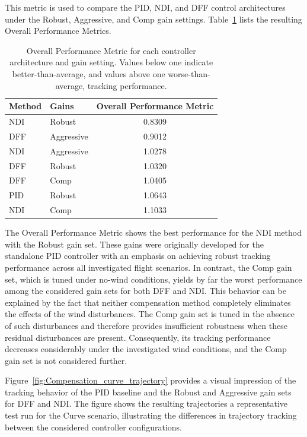 This metric is used to compare the PID, NDI, and DFF control architectures under the Robust, Aggressive, and Comp gain settings. Table~\ref{tab:performance_metric} lists the resulting Overall Performance Metrics.

\begin{table}[htbp]
	\centering
	\caption{Overall Performance Metric for each controller architecture and gain setting. Values below one indicate better-than-average, and values above one worse-than-average, tracking performance.}
	\label{tab:performance_metric}
	\begin{tabular}{llc}
		\toprule
		Method & Gains & Overall Performance Metric \\
		\midrule
		NDI & Robust & 0.8309 \\
		DFF & Aggressive & 0.9012 \\
		NDI & Aggressive & 1.0278 \\
		DFF & Robust & 1.0320 \\
		DFF & Comp & 1.0405 \\
		PID & Robust & 1.0643 \\
		NDI & Comp & 1.1033 \\
		\bottomrule
	\end{tabular}
\end{table}

The Overall Performance Metric shows the best performance for the NDI method with the Robust gain set. These gains were originally developed for the standalone PID controller with an emphasis on achieving robust tracking performance across all investigated flight scenarios. 
In contrast, the Comp gain set, which is tuned under no-wind conditions, yields by far the worst performance among the considered gain sets for both DFF and NDI. This behavior can be explained by the fact that neither compensation method completely eliminates the effects of the wind disturbances. 
The Comp gain set is tuned in the absence of such disturbances and therefore provides insufficient robustness when these residual disturbances are present. Consequently, its tracking performance decreases considerably under the investigated wind conditions, and the Comp gain set is not considered further.

Figure~\ref{fig:Compensation_curve_trajectory} provides a visual impression of the tracking behavior of the PID baseline and the Robust and Aggressive gain sets for DFF and NDI. The figure shows the resulting trajectories a representative test run for the Curve scenario, illustrating the differences in trajectory tracking between the considered controller configurations. 

